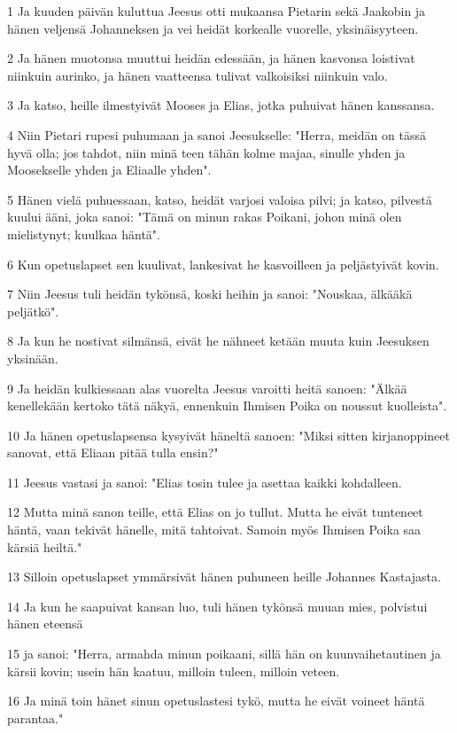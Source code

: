 \par 1 Ja kuuden päivän kuluttua Jeesus otti mukaansa Pietarin sekä Jaakobin ja hänen veljensä Johanneksen ja vei heidät korkealle vuorelle, yksinäisyyteen.
\par 2 Ja hänen muotonsa muuttui heidän edessään, ja hänen kasvonsa loistivat niinkuin aurinko, ja hänen vaatteensa tulivat valkoisiksi niinkuin valo.
\par 3 Ja katso, heille ilmestyivät Mooses ja Elias, jotka puhuivat hänen kanssansa.
\par 4 Niin Pietari rupesi puhumaan ja sanoi Jeesukselle: "Herra, meidän on tässä hyvä olla; jos tahdot, niin minä teen tähän kolme majaa, sinulle yhden ja Moosekselle yhden ja Eliaalle yhden".
\par 5 Hänen vielä puhuessaan, katso, heidät varjosi valoisa pilvi; ja katso, pilvestä kuului ääni, joka sanoi: "Tämä on minun rakas Poikani, johon minä olen mielistynyt; kuulkaa häntä".
\par 6 Kun opetuslapset sen kuulivat, lankesivat he kasvoilleen ja peljästyivät kovin.
\par 7 Niin Jeesus tuli heidän tykönsä, koski heihin ja sanoi: "Nouskaa, älkääkä peljätkö".
\par 8 Ja kun he nostivat silmänsä, eivät he nähneet ketään muuta kuin Jeesuksen yksinään.
\par 9 Ja heidän kulkiessaan alas vuorelta Jeesus varoitti heitä sanoen: "Älkää kenellekään kertoko tätä näkyä, ennenkuin Ihmisen Poika on noussut kuolleista".
\par 10 Ja hänen opetuslapsensa kysyivät häneltä sanoen: "Miksi sitten kirjanoppineet sanovat, että Eliaan pitää tulla ensin?"
\par 11 Jeesus vastasi ja sanoi: "Elias tosin tulee ja asettaa kaikki kohdalleen.
\par 12 Mutta minä sanon teille, että Elias on jo tullut. Mutta he eivät tunteneet häntä, vaan tekivät hänelle, mitä tahtoivat. Samoin myös Ihmisen Poika saa kärsiä heiltä."
\par 13 Silloin opetuslapset ymmärsivät hänen puhuneen heille Johannes Kastajasta.
\par 14 Ja kun he saapuivat kansan luo, tuli hänen tykönsä muuan mies, polvistui hänen eteensä
\par 15 ja sanoi: "Herra, armahda minun poikaani, sillä hän on kuunvaihetautinen ja kärsii kovin; usein hän kaatuu, milloin tuleen, milloin veteen.
\par 16 Ja minä toin hänet sinun opetuslastesi tykö, mutta he eivät voineet häntä parantaa."
